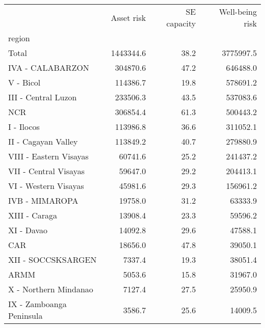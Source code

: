 \begin{tabular}{lrrr}
\toprule
{} &  Asset risk &  SE capacity &  Well-being risk \\
region                   &             &              &                  \\
\midrule
Total                    &   1443344.6 &         38.2 &        3775997.5 \\
IVA - CALABARZON         &    304870.6 &         47.2 &         646488.0 \\
V - Bicol                &    114386.7 &         19.8 &         578691.2 \\
III - Central Luzon      &    233506.3 &         43.5 &         537083.6 \\
NCR                      &    306854.4 &         61.3 &         500443.2 \\
I - Ilocos               &    113986.8 &         36.6 &         311052.1 \\
II - Cagayan Valley      &    113849.2 &         40.7 &         279880.9 \\
VIII - Eastern Visayas   &     60741.6 &         25.2 &         241437.2 \\
VII - Central Visayas    &     59647.0 &         29.2 &         204413.1 \\
VI - Western Visayas     &     45981.6 &         29.3 &         156961.2 \\
IVB - MIMAROPA           &     19758.0 &         31.2 &          63333.9 \\
XIII - Caraga            &     13908.4 &         23.3 &          59596.2 \\
XI - Davao               &     14092.8 &         29.6 &          47588.1 \\
CAR                      &     18656.0 &         47.8 &          39050.1 \\
XII - SOCCSKSARGEN       &      7337.4 &         19.3 &          38051.4 \\
ARMM                     &      5053.6 &         15.8 &          31967.0 \\
X - Northern Mindanao    &      7127.4 &         27.5 &          25950.9 \\
IX - Zamboanga Peninsula &      3586.7 &         25.6 &          14009.5 \\
\bottomrule
\end{tabular}
